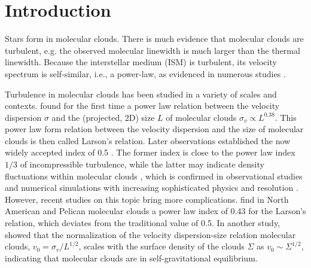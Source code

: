 \documentclass[iop,revtex4]{emulateapj}
\begin{document}


\section{Introduction}


Stars form in molecular clouds. There is much evidence that molecular clouds are turbulent, e.g. the observed molecular linewidth is much larger than the thermal linewidth. Because the interstellar medium (ISM) is turbulent, its velocity spectrum is self-similar, i.e., a power-law, as evidenced in numerous studies \citep[see the review by][and the references therein]{Hennebelle2012}.


Turbulence in molecular clouds has been studied in a variety of scales and contexts.
\cite{Larson1981} found for the first time a power law relation between the velocity dispersion $\sigma$ and the (projected, 2D) size $L$ of molecular clouds $\sigma_v\propto L^{0.38}$. This power law form relation between the velocity dispersion and the size of molecular clouds is then called Larson's relation. Later observations established the now widely accepted index of 0.5  \citep{Solomon_etal1987,Falgarone1992,Heyer2004}. The former index is close to the power law index $1/3$ of incompressible turbulence, while the latter may indicate density fluctuations within molecular clouds \citep{Vazquez-Semadeni1995}, which is confirmed in observational studies \citep{Turbulence_Brunt2002,Brunt2003} and numerical simulations with increasing sophisticated physics and resolution \citep{Ostriker2001, Offner2008, Kritsuk2013}. However, recent studies on this topic bring more complications. \cite{Zhang2014} find in North American and Pelican molecular clouds a power law index of 0.43 for the Larson's relation, which deviates from the traditional value of 0.5. In another study, \cite{Heyer2009} showed that the normalization of the velocity dispersion-size relation molecular clouds, $v_0=\sigma_v/L^{1/2}$, scales with the surface density of the clouds $\Sigma$ as $v_0\sim \Sigma^{1/2}$, indicating that molecular clouds are in self-gravitational equilibrium.
\end{document}
